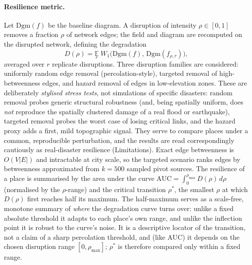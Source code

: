 \documentclass[sn-mathphys-num,pdflatex]{sn-jnl}
\newcommand{\Drho}{D(\rho)}
\newcommand{\rhostar}{\rho^{*}}
\begin{document}
\paragraph{Resilience metric.} Let $\mathrm{Dgm}(f)$ be the baseline diagram. A
disruption of intensity $\rho\in[0,1]$ removes a fraction $\rho$ of network
edges; the field and diagram are recomputed on the disrupted network, defining the
degradation
\[
\Drho=\underset{r}{\mathbb{E}}\;W_1\!\big(\mathrm{Dgm}(f),\,\mathrm{Dgm}(f_{\rho,r})\big),
\]
averaged over $r$ replicate disruptions. Three disruption families are considered:
uniformly random edge removal (percolation-style), targeted removal of
high-betweenness edges, and hazard removal of edges in low-elevation zones. These
are deliberately \emph{stylised stress tests}, not simulations of specific
disasters: random removal probes generic structural robustness (and, being spatially
uniform, does \emph{not} reproduce the spatially clustered damage of a real flood or
earthquake), targeted removal probes the worst case of losing critical links, and
the hazard proxy adds a first, mild topographic signal. They serve to compare
places under a common, reproducible perturbation, and the results are read
correspondingly cautiously as real-disaster resilience (Limitations). Exact
edge betweenness is $O(V\lvert E\rvert)$ and intractable at city scale, so the
targeted scenario ranks edges by betweenness approximated from $k=500$ sampled
pivot sources. The
resilience of a place is summarised by the area under the curve
$\mathrm{AUC}=\int_0^{\rho_{\max}}\Drho\,d\rho$ (normalised by the $\rho$-range)
and the critical transition $\rhostar$, the smallest $\rho$ at which $\Drho$ first
reaches half its maximum. The half-maximum serves as a scale-free, monotone
summary of \emph{where} the degradation curve turns over: unlike a fixed absolute
threshold it adapts to each place's own range, and unlike the inflection point it
is robust to the curve's noise. It is a descriptive locator of the transition, not
a claim of a sharp percolation threshold, and (like AUC) it depends on the chosen
disruption range $[0,\rho_{\max}]$; $\rhostar$ is therefore compared only within a
fixed range.
\end{document}
